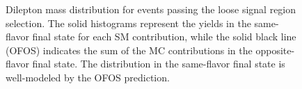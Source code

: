 \begin{figure}[hbt]
  \begin{center}
    \caption{Dilepton mass distribution for events passing the loose signal region selection. The solid histograms represent the yields in the same-flavor
      final state for each SM contribution, while the solid black line (OFOS) indicates the sum of the MC contributions in the opposite-flavor final state.
      The \ttbar distribution in the same-flavor final state is well-modeled by the OFOS prediction.}
    \label{fig:ttbar}
  \end{center}
\end{figure}

